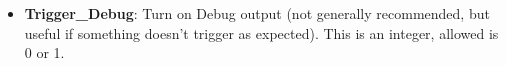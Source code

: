 \begin{itemize}
\begin{itemize}
    \begin{itemize}
     \item \textbf{Trigger\_Steered\_Scalar}: Name of the scalar to be changed
     \item \textbf{Trigger\_Steered\_Scalar\_Index}: Index of the scalar (in case it happens to be an array of scalars, otherwise leave it at 0)
     \item \textbf{Trigger\_Steered\_Scalar\_Value}: Value the scalar should be changed to - given as string
    \end{itemize}
  \end{itemize}
 \item \textbf{Trigger\_Debug}: Turn on Debug output (not generally recommended, but useful if something doesn't trigger as expected). This is an integer, allowed is 0 or 1.
\end{itemize}





